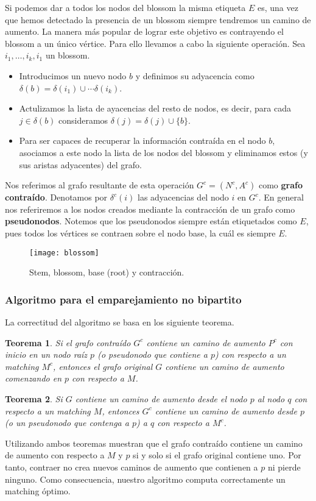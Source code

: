 \documentclass[twoside,12pt]{article}
\newtheorem{theorem}{Teorema}[section]
\begin{document}
Si podemos dar a todos los nodos del blossom la misma etiqueta $E$ es, una vez que hemos detectado la presencia de un blossom siempre tendremos un camino de aumento. La manera más popular de lograr este objetivo es contrayendo el blossom a un único vértice. Para ello llevamos a cabo la siguiente operación. Sea $i_1,\dotsc,i_k,i_1$ un blossom.
\begin{itemize}
\item Introducimos un nuevo nodo $b$ y definimos su adyacencia como $\delta(b)=\delta(i_1)\cup\cdots\delta(i_k)$.
\item Actulizamos la lista de ayacencias del resto de nodos, es decir, para cada $j\in \delta(b)$ consideramos $\delta(j)=\delta(j)\cup\{b\}$.
\item Para ser capaces de recuperar la información contraída en el nodo $b$, asociamos a este nodo la lista de los nodos del blossom y eliminamos estos (y sus aristas adyacentes) del grafo.	
\end{itemize}
Nos referimos al grafo resultante de esta operación $G^c = (N^c,A^c)$ como \textbf{grafo contraído}. Denotamos por $\delta^c(i)$ las adyacencias del nodo $i$ en $G^c$. En general nos referiremos a los nodos creados mediante la contracción de un grafo como \textbf{pseudonodos}. Notemos que los pseudonodos siempre están etiquetados como $E$, pues todos los vértices se contraen sobre el nodo base, la cuál es siempre $E$. 
\begin{figure}[h!]
\centering
\texttt{[image: blossom]}
\caption{Stem, blossom, base (root) y contracción.}
\end{figure}
\newpage
\subsubsection{Algoritmo para el emparejamiento no bipartito}

La correctitud del algoritmo se basa en los siguiente teorema.
\begin{theorem}
Si el grafo contraído $G^c$ contiene un camino de aumento $P^c$ con inicio en un nodo raíz $p$ (o pseudonodo que contiene a $p$) con respecto a un matching $M^c$, entonces el grafo original $G$ contiene un camino de aumento comenzando en $p$ con respecto a $M$.
\end{theorem}
\begin{theorem}
Si $G$ contiene un camino de aumento desde el nodo $p$  al nodo $q$ con respecto a un matching $M$, entonces $G^c$ contiene un camino de aumento desde $p$ (o un pseudonodo que contenga a $p$) a $q$ con respecto a $M^c$.
\end{theorem}
Utilizando ambos teoremas muestran que el grafo contraído contiene un camino de aumento con respecto a $M$ y $p$ si y solo si el grafo original contiene uno. Por tanto, contraer no crea nuevos caminos de aumento que contienen a $p$ ni pierde ninguno. Como consecuencia, nuestro algoritmo computa correctamente un matching óptimo.
\end{document}
